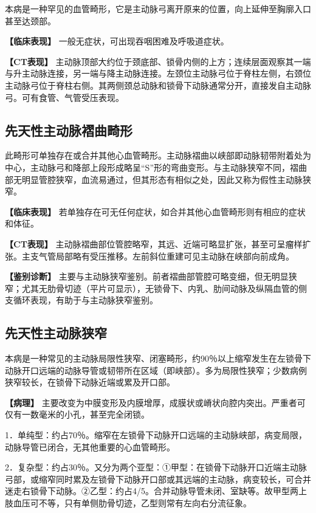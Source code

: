 本病是一种罕见的血管畸形，它是主动脉弓离开原来的位置，向上延伸至胸廓入口甚至达颈部。

\textbf{【临床表现】} 一般无症状，可出现吞咽困难及呼吸道症状。

\textbf{【CT表现】}
主动脉顶部大约位于颈底部、锁骨内侧的上方；连续层面观察其一端与升主动脉连接，另一端与降主动脉连接。左颈位主动脉弓位于脊柱左侧，右颈位主动脉弓位于脊柱右侧。其两侧颈总动脉和锁骨下动脉通常分开，直接发自主动脉弓。可有食管、气管受压表现。

\subsection{先天性主动脉褶曲畸形}

此畸形可单独存在或合并其他心血管畸形。主动脉褶曲以峡部即动脉韧带附着处为中心，主动脉弓和降部上段形成略呈“S”形的弯曲变形。与主动脉狭窄不同，褶曲部无明显管腔狭窄，血流易通过，但其形态有相似之处，因此又称为假性主动脉狭窄。

\textbf{【临床表现】}
若单独存在可无任何症状，如合并其他心血管畸形则有相应的症状和体征。

\textbf{【CT表现】}
主动脉褶曲部位管腔略窄，其远、近端可略显扩张，甚至可呈瘤样扩张。主支气管局部略有受压推移。左前斜位重建可见主动脉在峡部向前成角。

\textbf{【鉴别诊断】}
主要与主动脉狭窄鉴别。前者褶曲部管腔可略变细，但无明显狭窄；尤其无肋骨切迹（平片可显示），无锁骨下、内乳、肋间动脉及纵隔血管的侧支循环表现，有助于与主动脉狭窄鉴别。

\subsection{先天性主动脉狭窄}

本病是一种常见的主动脉局限性狭窄、闭塞畸形，约90％以上缩窄发生在左锁骨下动脉开口远端的动脉导管或韧带所在区域（即峡部）。多为局限性狭窄；少数病例狭窄较长，在锁骨下动脉近端或累及开口部。

\textbf{【病理】}
主要改变为中膜变形及内膜增厚，成膜状或嵴状向腔内突出。严重者可仅有一数毫米的小孔，甚至完全闭锁。

1．单纯型：约占70％。缩窄在左锁骨下动脉开口远端的主动脉峡部，病变局限，动脉导管已闭合，无其他重要的心血管畸形。

2．复杂型：约占30％。又分为两个亚型：①甲型：在锁骨下动脉开口近端主动脉弓部，或缩窄同时累及左锁骨下动脉开口部或其远端的主动脉，病变较长，可合并迷走右锁骨下动脉。②乙型：约占4/5。合并动脉导管未闭、室缺等。故甲型两上肢血压可不等，只有单侧肋骨切迹，乙型则常有左向右分流征象。

